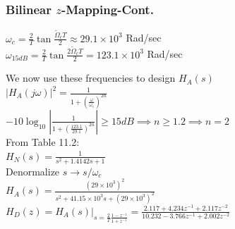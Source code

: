 \documentclass[mathserif, 10pt]{beamer} %
\begin{document}
\frame
{
\small
\frametitle{Bilinear $z$-Mapping-Cont.}

$\omega_c = \frac{2}{T} \tan \frac{\tilde\Omega_c T}{2} \approx 29.1 \times 10^3$ Rad/sec \\ \vspace{.05in}
$\omega_{15dB} = \frac{2}{T}\tan \frac{2\tilde \Omega_c T}{2} = 123.1 \times 10^3$ Rad/sec \\ \vspace{.1in}

We now use these frequencies to design $H_A(s)$ \\ \vspace{.05in}
$|H_A(j\omega)|^2 = \frac{1}{1+\left(\frac{\omega}{\omega_c}\right)^{2n}}$\\ \vspace{.05in}
$-10 \log_{10} {\left| \frac{1}{1+\left(\frac{123.1}{29.1}\right)^{2n}}\right|} \ge 15dB \implies n\ge 1.2 \implies n=2$\\ \vspace{.05in}
From Table 11.2: \\ \vspace{.05in}
$H_N(s) = \frac{1}{s^2+1.4142s+1}$\\ \vspace{.05in}
Denormalize $s \to s/\omega_c$\\ \vspace{.1in}
$H_A(s) = \frac{(29 \times 10^3)^2}{s^2+41.15 \times 10^3s + (29 \times 10^3)^2}$\\ \vspace{.1in}
$H_D(z) = H_A(s)|_{s = \frac{2}{T}\frac{1-z^{-1}}{1+z^{-1}}} = \frac{2.117+4.234z^{-1}+2.117z^{-2}}{10.232-3.766z^{-1}+2.002z^{-2}}$

}
\end{document}
